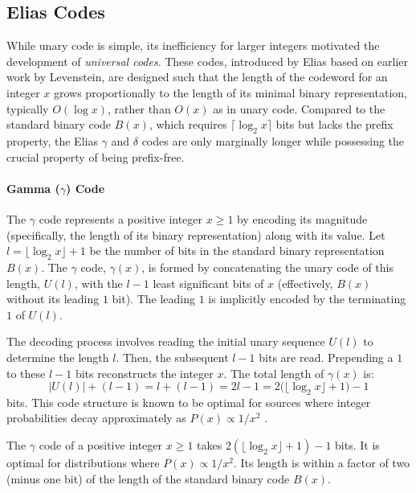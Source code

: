 \subsection{Elias Codes}
While unary code is simple, its inefficiency for larger integers motivated the development of \emph{universal codes}. These codes, introduced by Elias \cite{Elias1975} based on earlier work by Levenstein, are designed such that the length of the codeword for an integer $x$ grows proportionally to the length of its minimal binary representation, typically $O(\log x)$, rather than $O(x)$ as in unary code. Compared to the standard binary code $B(x)$, which requires $\lceil\log_2 x \rceil$ bits but lacks the prefix property, the Elias $\gamma$ and $\delta$ codes are only marginally longer while possessing the crucial property of being prefix-free.

\paragraph{Gamma ($\gamma$) Code} The $\gamma$ code represents a positive integer $x \ge 1$ by encoding its magnitude (specifically, the length of its binary representation) along with its value. Let $l = \lfloor \log_2 x \rfloor + 1$ be the number of bits in the standard binary representation $B(x)$. The $\gamma$ code, $\gamma(x)$, is formed by concatenating the unary code of this length, $U(l)$, with the $l-1$ least significant bits of $x$ (effectively, $B(x)$ without its leading $1$ bit). The leading $1$ is implicitly encoded by the terminating $1$ of $U(l)$.

The decoding process involves reading the initial unary sequence $U(l)$ to determine the length $l$. Then, the subsequent $l-1$ bits are read. Prepending a $1$ to these $l-1$ bits reconstructs the integer $x$. The total length of $\gamma(x)$ is:
\begin{equation*}
    |U(l)| + (l-1) = l + (l-1) = 2l - 1 = 2\bigl(\lfloor \log_2 x \rfloor + 1\bigr) - 1
\end{equation*}
bits. This code structure is known to be optimal for sources where integer probabilities decay approximately as $P(x) \propto 1/x^2$ \cite{witten1999managing}.

\begin{theorem}
    The $\gamma$ code of a positive integer $x \ge 1$ takes $2(\lfloor \log_2 x \rfloor + 1) - 1$ bits. It is optimal for distributions where $P(x) \propto 1/x^2$. Its length is within a factor of two (minus one bit) of the length of the standard binary code $B(x)$.
\end{theorem}

